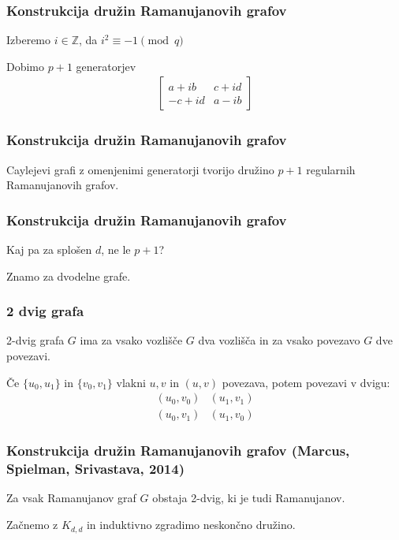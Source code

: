 \documentclass{beamer}
\begin{document}
\begin{frame}
\frametitle{Konstrukcija družin Ramanujanovih grafov}
Izberemo \(i\in\mathbb Z\), da \(i^2 \equiv -1\pmod{q}\)

Dobimo \(p+1\) generatorjev
\begin{align*}
    \begin{bmatrix}
        a + ib  & c+id \\
        -c + id & a-ib
    \end{bmatrix}
\end{align*}
\end{frame}
\begin{frame}
    \frametitle{Konstrukcija družin Ramanujanovih grafov}
    Caylejevi grafi z omenjenimi generatorji tvorijo družino \(p+1\) regularnih Ramanujanovih grafov.
\end{frame}
\begin{frame}
    \frametitle{Konstrukcija družin Ramanujanovih grafov}
    Kaj pa za splošen \(d\), ne le \(p+1\)?\pause

    Znamo za dvodelne grafe.
\end{frame}
\begin{frame}
    \frametitle{2 dvig grafa}
    2-dvig grafa \(G\) ima za vsako vozlišče \(G\) dva vozlišča in za vsako povezavo \(G\) dve povezavi.\pause
    
    Če \(\{u_0, u_1\}\) in \(\{v_0, v_1\}\) vlakni \(u, v\) in \((u,v)\) povezava, potem povezavi v dvigu:
    \begin{align*}
        (u_0, v_0) &(u_1, v_1) \\
        (u_0, v_1) &(u_1, v_0)
    \end{align*}
\end{frame}
\begin{frame}
    \frametitle{Konstrukcija družin Ramanujanovih grafov (Marcus, Spielman, Srivastava, 2014)}
    Za vsak Ramanujanov graf \(G\) obstaja 2-dvig, ki je tudi Ramanujanov.\pause

    Začnemo z \(K_{d,d}\) in induktivno zgradimo neskončno družino.
\end{frame}
\end{document}
